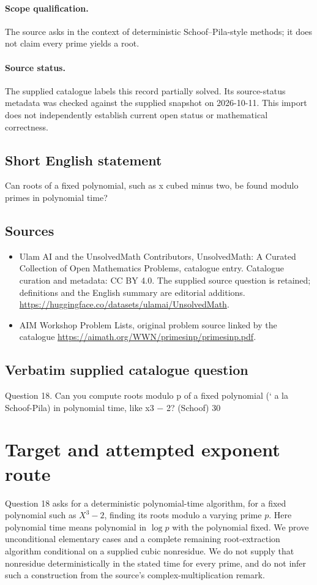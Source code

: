 \documentclass[11pt]{article}
\begin{document}
\paragraph{Scope qualification.}
The source asks in the context of deterministic Schoof--Pila-style methods; it does not claim every prime yields a root.
\paragraph{Source status.}
The supplied catalogue labels this record partially solved. Its source-status metadata was checked against the supplied snapshot on 2026-10-11. This import does not independently establish current open status or mathematical correctness.
\subsection{Short English statement}
Can roots of a fixed polynomial, such as x cubed minus two, be found modulo primes in polynomial time?
\subsection{Sources}
\begin{itemize}
\item[S1] Ulam AI and the UnsolvedMath Contributors, UnsolvedMath: A Curated Collection of Open Mathematics Problems, catalogue entry. Catalogue curation and metadata: CC BY 4.0. The supplied source question is retained; definitions and the English summary are editorial additions.
\url{https://huggingface.co/datasets/ulamai/UnsolvedMath}.
\item[S2] AIM Workshop Problem Lists, original problem source linked by the catalogue
\url{https://aimath.org/WWN/primesinp/primesinp.pdf}.
\end{itemize}
\subsection{Verbatim supplied catalogue question}
Question 18. Can you compute roots modulo p of a fixed polynomial (` a la Schoof-Pila) in polynomial time, like x3 − 2? (Schoof) 30

\section{Target and attempted exponent route}
Question 18 asks for a deterministic polynomial-time algorithm, for a
fixed polynomial such as $X^3-2$, finding its roots modulo a varying
prime $p$. Here polynomial time means polynomial in $\log p$ with
the polynomial fixed. We prove unconditional elementary cases and a
complete remaining root-extraction algorithm conditional on a supplied
cubic nonresidue. We do not supply that nonresidue deterministically
in the stated time for every prime, and do not infer such a construction
from the source's complex-multiplication remark.
\end{document}
